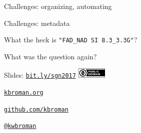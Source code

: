 \documentclass[12pt,t]{beamer}
\begin{document}
\begin{frame}[c]{Challenges: {\color{foreground} organizing, automating}}


\end{frame}


\begin{frame}[c]{Challenges: {\color{foreground} metadata}}


  \centerline{What the heck is {\hilit \tt "FAD\_NAD SI 8.3\_3.3G"}?}

\end{frame}



\begin{frame}[c]{}
\centerline{\Large What was the question again?}
\end{frame}



\begin{frame}[c]{}

\Large

Slides: \href{http://bit.ly/sgn2017}{\tt bit.ly/sgn2017} \quad
\includegraphics[height=5mm]{Figs/cc-zero.png}

\vspace{7mm}

\href{http://kbroman.org}{\tt \lolit kbroman.org}

\vspace{7mm}

\href{https://github.com/kbroman}{\tt \lolit github.com/kbroman}

\vspace{7mm}

\href{https://twitter.com/kwbroman}{\tt \lolit @kwbroman}


\end{frame}
\end{document}
